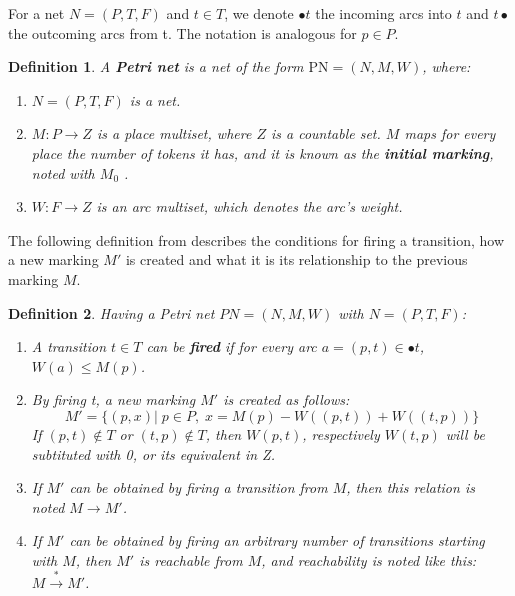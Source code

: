 \documentclass[12pt]{article}
\newtheorem{definition}{Definition}
\begin{document}
    For a net \(N=(P,T,F)\) and \(t \in T\), we denote $\bullet t$ the incoming arcs into $t$ and $t \bullet$ the outcoming arcs from t. The notation is analogous for $p \in P$.

    \begin{definition}
        A \textbf{Petri net} is a net of the form $\mathrm{PN}=(N,M,W)$, where: 
        \begin{enumerate}
            \item $N=(P,T,F)$ is a net.
            \item \(M: P \rightarrow Z\) is a place multiset, where \(Z\) is a countable set. \(M\) maps for every place the number of tokens it has, and it is known as the \textbf{initial marking}, noted with \(M_0\) .
            \item \(W: F \rightarrow Z\) is an arc multiset, which denotes the arc's weight. 
        \end{enumerate}
    \end{definition}

    The following definition from \cite{diaz2013petri} describes the conditions for firing a transition, how a new marking $M'$ is created and what it is its relationship to the previous marking $M$.
    \begin{definition}
        Having a Petri net \(PN=(N,M,W)\) with \(N=(P,T,F)\):  
        \begin{enumerate}
            \item A transition \(t \in T\) can be \textbf{fired} if for every arc \(a=(p,t) \in \bullet t\), \(W(a) \le M(p)\).
            \item By firing t, a new marking $M'$ is created as follows: 
            \begin{displaymath}
                M'=\{(p,x)|\; p \in P,\; x = M(p) - W((p,t)) + W((t,p))\}
            \end{displaymath}
            If \((p,t)\notin T\) or \((t,p)\notin T\), then \(W(p,t)\), respectively \(W(t,p)\) will be subtituted with 0, or its equivalent in Z.
            \item If $M'$ can be obtained by firing a transition from $M$, then this relation is noted \(M \rightarrow M'\). 
            \item If $M'$ can be obtained by firing an arbitrary number of transitions starting with $M$, then $M'$ is reachable from $M$, and reachability is noted like this: \(M \xrightarrow{*} M'\).
        \end{enumerate}
    \end{definition}
\end{document}
